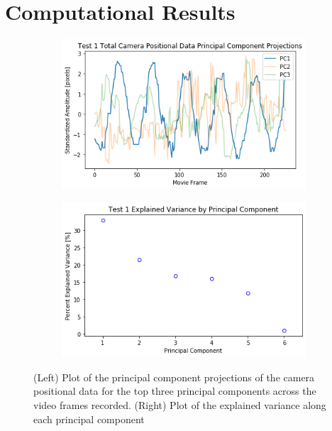 \documentclass{article}
\begin{document}
\section{Computational Results}
\begin{figure}
\centering
   \begin{subfigure}{0.49\linewidth} \centering
     \includegraphics[scale=0.5]{T1_pcDynamics.png}
   \end{subfigure}
   \begin{subfigure}{0.49\linewidth} \centering
     \includegraphics[scale=0.5]{T1_pcExplainedVariance.png}
   \end{subfigure}
\caption{(Left) Plot of the principal component projections of the camera positional data for the top three principal components across the video frames recorded. (Right) Plot of the explained variance along each principal component} \label{fig:test1}
\end{figure}
\end{document}
